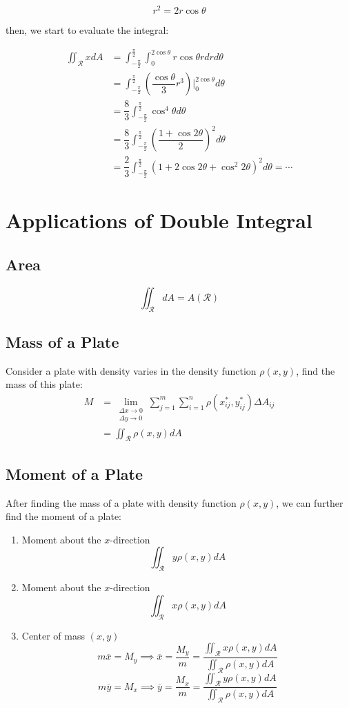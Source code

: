 \documentclass[UTF8,a4paper, 10pt, openany]{svmono}
\begin{document}
$$r^2=2r\cos \theta$$

then, we start to evaluate the integral:

\begin{align*}
\iint_{\mathcal{R}}xdA &= \int_{-\frac{\pi}{2}}^{\frac{\pi}{2}}\int_{0}^{2\cos \theta}r\cos \theta rdrd\theta \\
&= \int_{-\frac{\pi}{2}}^{\frac{\pi}{2}} \left(\dfrac{\cos \theta}{3}r^3\right)|_{0}^{2\cos \theta}d\theta \\
&= \dfrac{8}{3}\int_{-\frac{\pi}{2}}^{\frac{\pi}{2}}\cos^4\theta d\theta \\
&= \dfrac{8}{3}\int_{-\frac{\pi}{2}}^{\frac{\pi}{2}}\left(\dfrac{1+\cos 2\theta}{2}\right)^2d\theta \\
&= \dfrac{2}{3}\int_{-\frac{\pi}{2}}^{\frac{\pi}{2}}\left(1+2\cos 2\theta +\cos^2 2\theta \right)^2d\theta =\cdots
\end{align*}
\section{Applications of Double Integral}
\subsection{Area}
$$\iint_{\mathcal{R}}dA=A(\mathcal{R})$$
\subsection{Mass of a Plate}
Consider a plate with density varies in the density function $\rho (x,y)$, find the mass of this plate:
\begin{align*}
M &= \lim_{\substack{\Delta x\to 0 \\ \Delta y\to 0}}\sum_{j=1}^{m}\sum_{i=1}^{n}\rho (x_{ij}^*,y_{ij}^*)\Delta A_{ij}\\
&= \iint_{\mathcal{R}}\rho (x,y)dA
\end{align*}
\subsection{Moment of a Plate}
After finding the mass of a plate with density function $\rho (x,y)$, we can further find the moment of a plate:\\
\begin{enumerate}
\item Moment about the $x$-direction
$$\iint_{\mathcal{R}}y\rho (x,y)dA$$
\item Moment about the $x$-direction
$$\iint_{\mathcal{R}}x\rho (x,y)dA$$
\item Center of mass $(x,y)$
$$m\overline{x}=M_y \implies \overline{x}=\dfrac{M_y}{m}=\dfrac{\displaystyle\iint_{\mathcal{R}}x\rho (x,y)dA}{\displaystyle\iint_{\mathcal{R}}\rho (x,y)dA}$$
$$m\overline{y}=M_x \implies \overline{y}=\dfrac{M_x}{m}=\dfrac{\displaystyle\iint_{\mathcal{R}}y\rho (x,y)dA}{\displaystyle\iint_{\mathcal{R}}\rho (x,y)dA}$$
\end{enumerate}
\end{document}
